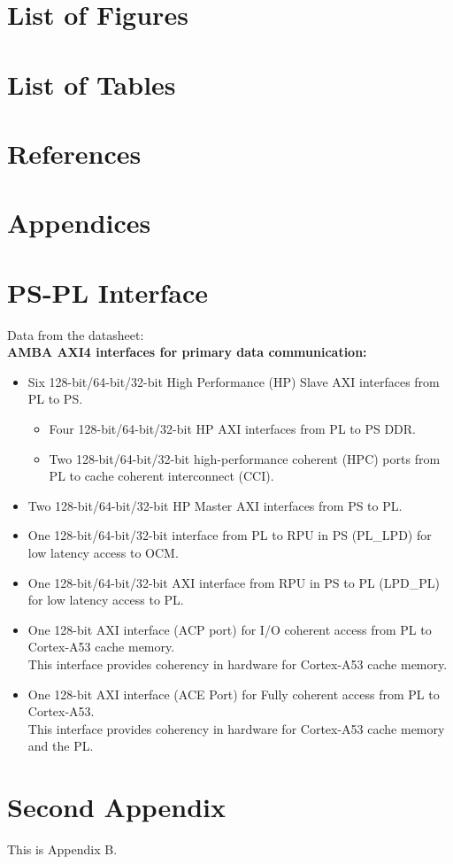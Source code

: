 \documentclass{article}
\begin{document}
\section{List of Figures}

\section{List of Tables}

\section{References}
\printbibliography

\newpage

\section{Appendices}
\appendix
\section{PS-PL Interface} \label{sec:appendixPS-PL_interface}
Data from the datasheet\cite{ZU9EG_datasheet}:\\
\noindent\textbf{AMBA AXI4 interfaces for primary data communication:}
\begin{itemize}
    \item Six 128-bit/64-bit/32-bit High Performance (HP) Slave AXI interfaces from PL to PS.
        \begin{itemize}
            \item Four 128-bit/64-bit/32-bit HP AXI interfaces from PL to PS DDR.
            \item Two 128-bit/64-bit/32-bit high-performance coherent (HPC) ports from PL to cache coherent interconnect (CCI).
        \end{itemize}
    \item Two 128-bit/64-bit/32-bit HP Master AXI interfaces from PS to PL.
    \item One 128-bit/64-bit/32-bit interface from PL to RPU in PS (PL\_LPD) for low latency access to OCM.
    \item One 128-bit/64-bit/32-bit AXI interface from RPU in PS to PL (LPD\_PL) for low latency access to PL.
    \item One 128-bit AXI interface (ACP port) for I/O coherent access from PL to Cortex-A53 cache memory.\\
        This interface provides coherency in hardware for Cortex-A53 cache memory.
    \item One 128-bit AXI interface (ACE Port) for Fully coherent access from PL to Cortex-A53.\\
        This interface provides coherency in hardware for Cortex-A53 cache memory and the PL.
\end{itemize}


\section{Second Appendix} \label{sec:appendixB}
This is Appendix B.
\end{document}
